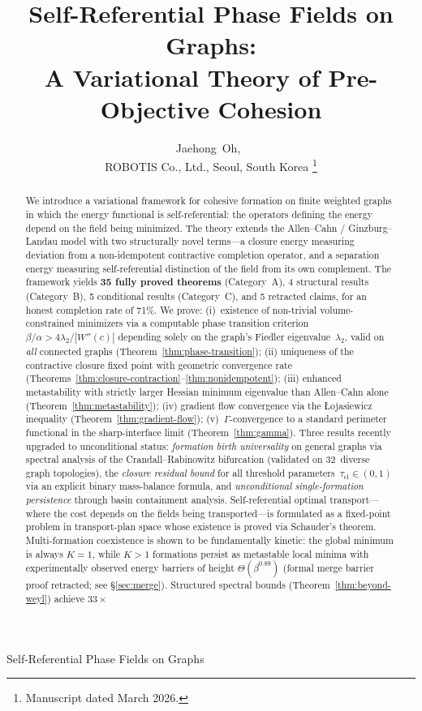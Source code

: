 \documentclass[lettersize,journal]{IEEEtran}
\begin{document}
\title{Self-Referential Phase Fields on Graphs:\\ A Variational Theory of Pre-Objective Cohesion}

\author{Jaehong~Oh,~\\
ROBOTIS Co., Ltd., Seoul, South Korea%
\thanks{Manuscript dated March 2026.}}

%
{Self-Referential Phase Fields on Graphs}

\maketitle

\begin{abstract}
We introduce a variational framework for cohesive formation on finite weighted graphs in which the energy functional is self-referential: the operators defining the energy depend on the field being minimized. The theory extends the Allen--Cahn / Ginzburg--Landau model with two structurally novel terms---a closure energy measuring deviation from a non-idempotent contractive completion operator, and a separation energy measuring self-referential distinction of the field from its own complement. The framework yields \textbf{35 fully proved theorems} (Category~A), 4 structural results (Category~B), 5 conditional results (Category~C), and 5 retracted claims, for an honest completion rate of 71\%. We prove: (i)~existence of non-trivial volume-constrained minimizers via a computable phase transition criterion $\beta/\alpha > 4\lambda_2/|W''(c)|$ depending solely on the graph's Fiedler eigenvalue~$\lambda_2$, valid on \emph{all} connected graphs (Theorem~\ref{thm:phase-transition}); (ii) uniqueness of the contractive closure fixed point with geometric convergence rate (Theorems~\ref{thm:closure-contraction}--\ref{thm:nonidempotent}); (iii) enhanced metastability with strictly larger Hessian minimum eigenvalue than Allen--Cahn alone (Theorem~\ref{thm:metastability}); (iv) gradient flow convergence via the \L{}ojasiewicz inequality (Theorem~\ref{thm:gradient-flow}); (v)~$\Gamma$-convergence to a standard perimeter functional in the sharp-interface limit (Theorem~\ref{thm:gamma}). Three results recently upgraded to unconditional status: \emph{formation birth universality} on general graphs via spectral analysis of the Crandall--Rabinowitz bifurcation (validated on 32~diverse graph topologies), the \emph{closure residual bound} for all threshold parameters~$\tau_{\mathrm{cl}} \in (0,1)$ via an explicit binary mass-balance formula, and \emph{unconditional single-formation persistence} through basin containment analysis. Self-referential optimal transport---where the cost depends on the fields being transported---is formulated as a fixed-point problem in transport-plan space whose existence is proved via Schauder's theorem. Multi-formation coexistence is shown to be fundamentally kinetic: the global minimum is always $K=1$, while $K>1$ formations persist as metastable local minima with experimentally observed energy barriers of height $\Theta(\beta^{0.89})$ (formal merge barrier proof retracted; see \S\ref{sec:merge}). Structured spectral bounds (Theorem~\ref{thm:beyond-weyl}) achieve $33\times$ 
\end{abstract}
\end{document}
